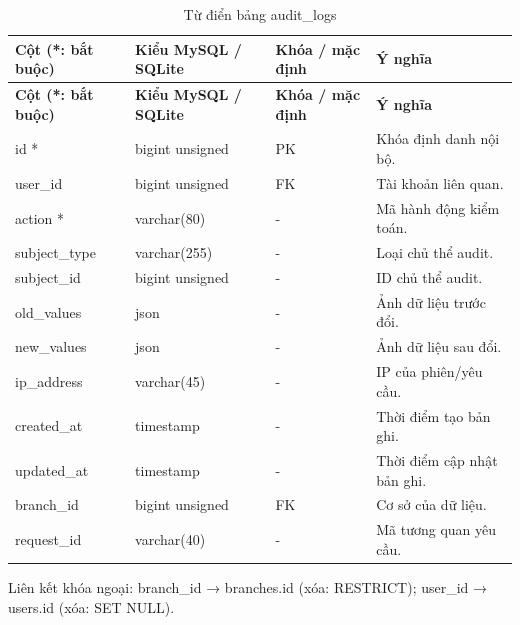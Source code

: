 {\fontsize{10}{12}\selectfont\setlength{\tabcolsep}{3pt}\renewcommand{\arraystretch}{1.12}
\begin{longtable}{@{}L{\textwidth-4.86pt\relax} L{\textwidth-3.96pt\relax} L{\textwidth-2.88pt\relax} L{\textwidth-6.3pt\relax}@{}}
\caption{Từ điển bảng audit\_\allowbreak{}logs}\\
\toprule
\textbf{Cột (*:\allowbreak{} bắt buộc)} & \textbf{Kiểu My\allowbreak{}SQL /\allowbreak{} SQLite} & \textbf{Khóa /\allowbreak{} mặc định} & \textbf{Ý nghĩa}\\\midrule
\endfirsthead
\toprule
\textbf{Cột (*:\allowbreak{} bắt buộc)} & \textbf{Kiểu My\allowbreak{}SQL /\allowbreak{} SQLite} & \textbf{Khóa /\allowbreak{} mặc định} & \textbf{Ý nghĩa}\\\midrule
\endhead
\bottomrule\endlastfoot
id * & bigint unsigned & PK & Khóa định danh nội bộ.\allowbreak{}\\[1pt]
user\_\allowbreak{}id & bigint unsigned & FK & Tài khoản liên quan.\allowbreak{}\\[1pt]
action * & varchar(80) & - & Mã hành động kiểm toán.\allowbreak{}\\[1pt]
subject\_\allowbreak{}type & varchar(255) & - & Loại chủ thể audit.\allowbreak{}\\[1pt]
subject\_\allowbreak{}id & bigint unsigned & - & ID chủ thể audit.\allowbreak{}\\[1pt]
old\_\allowbreak{}values & json & - & Ảnh dữ liệu trước đổi.\allowbreak{}\\[1pt]
new\_\allowbreak{}values & json & - & Ảnh dữ liệu sau đổi.\allowbreak{}\\[1pt]
ip\_\allowbreak{}address & varchar(45) & - & IP của phiên/\allowbreak{}yêu cầu.\allowbreak{}\\[1pt]
created\_\allowbreak{}at & timestamp & - & Thời điểm tạo bản ghi.\allowbreak{}\\[1pt]
updated\_\allowbreak{}at & timestamp & - & Thời điểm cập nhật bản ghi.\allowbreak{}\\[1pt]
branch\_\allowbreak{}id & bigint unsigned & FK & Cơ sở của dữ liệu.\allowbreak{}\\[1pt]
request\_\allowbreak{}id & varchar(40) & - & Mã tương quan yêu cầu.\allowbreak{}\\[1pt]
\end{longtable}}
Liên kết khóa ngoại:\allowbreak{} branch\_\allowbreak{}id → branches.\allowbreak{}id (xóa:\allowbreak{} RESTRICT); user\_\allowbreak{}id → users.\allowbreak{}id (xóa:\allowbreak{} SET NULL).\allowbreak{}

